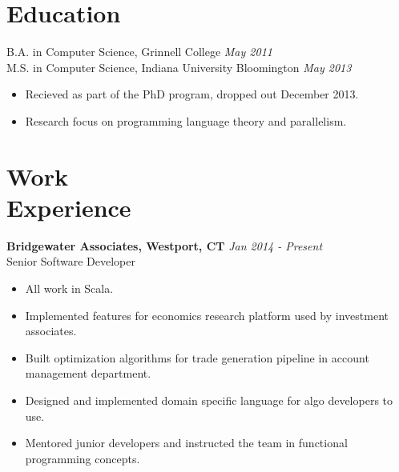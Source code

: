 \documentclass[margin]{res}
\begin{document}
 
 

\address{{\bf Contact} \\ jobs@aarontodd.name \\ (415) 847-0997 }

\address{{\bf Address} \\ 8 Haviland St. Apt B \\ Norwalk, CT 06854 }


\begin{resume} 
 
\section{Education}
B.A. in Computer Science, Grinnell College \hfill \textit{May 2011} \\
M.S. in Computer Science, Indiana University Bloomington \hfill \textit{May 2013}
\begin{itemize} \itemsep -2pt
\item Recieved as part of the PhD program, dropped out December 2013.
\item Research focus on programming language theory and parallelism.
\end{itemize}  
 

\section{Work \\ Experience}

 {\bf Bridgewater Associates, Westport, CT} \hfill \textit{Jan 2014 - Present} \\
 Senior Software Developer
 \begin{itemize} \itemsep -2pt  %
 \item All work in Scala.
 \item Implemented features for economics research platform used by investment associates.
 \item Built optimization algorithms for trade generation pipeline in account management department.
 \item Designed and implemented domain specific language for algo developers to use.
 \item Mentored junior developers and instructed the team in functional programming concepts.
 \end{itemize}


\end{resume}
\end{document}

